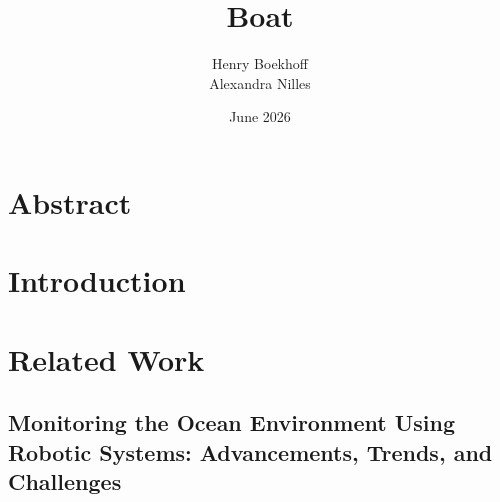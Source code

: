 \documentclass[sigconf, nonacm]{acmart}
\title{Boat}
\author{Henry Boekhoff \\
Alexandra Nilles}
\date{June 2026}
\begin{document}
\maketitle

\section{Abstract}
\section{Introduction}
\section{Related Work}
\subsection{Monitoring the Ocean Environment Using Robotic Systems: Advancements, Trends, and Challenges \cite{agarwala2026monitoring}}


\printbibliography
\end{document}
